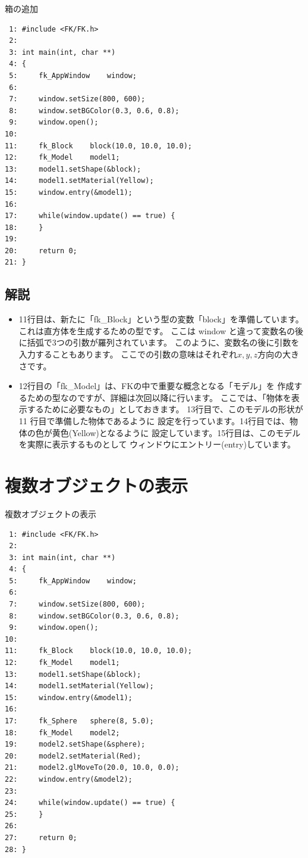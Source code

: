 \newpage
\begin{itembox}[l]{箱の追加}
\begin{verbatim}
 1: #include <FK/FK.h>
 2: 
 3: int main(int, char **)
 4: {
 5:     fk_AppWindow    window;
 6: 
 7:     window.setSize(800, 600);
 8:     window.setBGColor(0.3, 0.6, 0.8);
 9:     window.open();
10: 
11:     fk_Block    block(10.0, 10.0, 10.0);
12:     fk_Model    model1;
13:     model1.setShape(&block);
14:     model1.setMaterial(Yellow);
15:     window.entry(&model1);
16: 
17:     while(window.update() == true) {
18:     }
19: 
20:     return 0;
21: }
\end{verbatim}
\end{itembox}
\subsection*{解説}
\begin{itemize}
 \item 11行目は、新たに「fk\_Block」という型の変数「block」を準備しています。
	これは直方体を生成するための型です。
	ここは window と違って変数名の後に括弧で3つの引数が羅列されています。
	このように、変数名の後に引数を入力することもあります。
	ここでの引数の意味はそれぞれ\(x, y, z\)方向の大きさです。

 \item 12行目の「fk\_Model」は、FKの中で重要な概念となる「モデル」を
	作成するための型なのですが、詳細は次回以降に行います。
	ここでは、「物体を表示するために必要なもの」としておきます。
	13行目で、このモデルの形状が 11 行目で準備した物体であるように
	設定を行っています。14行目では、物体の色が黄色(Yellow)となるように
	設定しています。15行目は、このモデルを実際に表示するものとして
	ウィンドウにエントリー(entry)しています。

\end{itemize}

\section{複数オブジェクトの表示} \label{sec:01-pluralobj}
\begin{itembox}[l]{複数オブジェクトの表示}
\begin{verbatim}
 1: #include <FK/FK.h>
 2: 
 3: int main(int, char **)
 4: {
 5:     fk_AppWindow    window;
 6: 
 7:     window.setSize(800, 600);
 8:     window.setBGColor(0.3, 0.6, 0.8);
 9:     window.open();
10: 
11:     fk_Block    block(10.0, 10.0, 10.0);
12:     fk_Model    model1;
13:     model1.setShape(&block);
14:     model1.setMaterial(Yellow);
15:     window.entry(&model1);
16: 
17:     fk_Sphere   sphere(8, 5.0);
18:     fk_Model    model2;
19:     model2.setShape(&sphere);
20:     model2.setMaterial(Red);
21:     model2.glMoveTo(20.0, 10.0, 0.0);
22:     window.entry(&model2);
23: 
24:     while(window.update() == true) {
25:     }
26: 
27:     return 0;
28: }
\end{verbatim}
\end{itembox}

